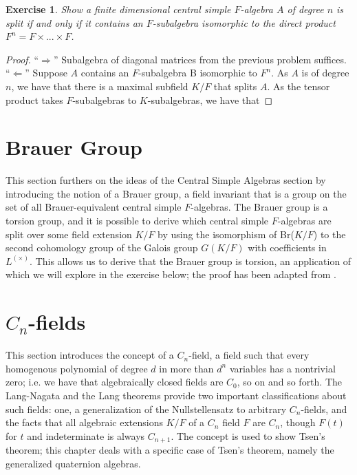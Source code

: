 \documentclass{article}
\newtheorem{exercise}{Exercise}[section]
\begin{document}
\begin{exercise}
Show a finite dimensional central simple $F$-algebra $A$ of degree $n$
is split if and only if it contains an $F$-subalgebra isomorphic to the
direct product $F^{n} = F \times ... \times F$.
\end{exercise}
\begin{proof}

  ``$\Rightarrow$'' Subalgebra of diagonal matrices from the previous problem suffices. \\
  ``$\Leftarrow$'' Suppose $A$ contains an $F$-subalgebra B isomorphic to $F^{n}$. As $A$ is of degree $n$, we have that there is a maximal subfield $K/F$ that splits $A$. As the tensor product takes $F$-subalgebras to $K$-subalgebras, we have that 

  
\end{proof}


\pagebreak


\section{Brauer Group}

This section furthers on the ideas of the Central Simple Algebras section by introducing the notion of a Brauer group, a field invariant that is a group on the set of all Brauer-equivalent central simple $F$-algebras. The Brauer group is a torsion group, and it is possible to derive which central simple $F$-algebras are split over some field extension $K/F$ by using the isomorphism of Br($K/F$) to the second cohomology group of the Galois group $G(K/F)$ with coefficients in $L^{(\times)}$. This allows us to derive that the Brauer group is torsion, an application of which we will explore in the exercise below; the proof has been adapted from \cite{CSABr}.  

\pagebreak


\section{$C_{n}$-fields}

This section introduces the concept of a $C_{n}$-field, a field such that every homogenous polynomial of degree $d$ in more than $d^{n}$ variables has a nontrivial zero; i.e. we have that algebraically closed fields are $C_{0}$, so on and so forth. The Lang-Nagata and the Lang theorems provide two important classifications about such fields: one, a generalization of the Nullstellensatz to arbitrary $C_{n}$-fields, and the facts that all algebraic extensions $K/F$ of a $C_{n}$ field $F$ are $C_{n}$, though $F(t)$ for $t$ and indeterminate is always $C_{n+1}$. The concept is used to show Tsen's theorem; this chapter deals with a specific case of Tsen's theorem, namely the generalized quaternion algebras.
\end{document}
